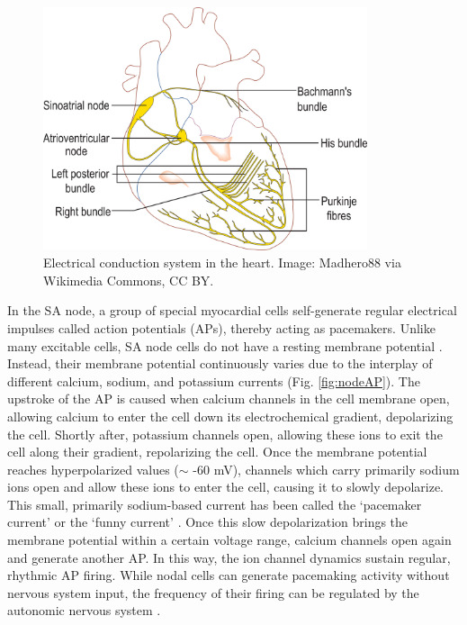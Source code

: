 \documentclass[12pt]{article}
\begin{document}
\begin{figure}[h!]
\centering
\includegraphics[width=0.85\textwidth]{figures/conduction.png}
\caption{Electrical conduction system in the heart. Image: Madhero88 via Wikimedia Commons, CC BY.}
\label{fig:conduction}
\end{figure}

In the SA node, a group of special myocardial cells self-generate regular electrical impulses called action potentials (APs), thereby acting as pacemakers. Unlike many excitable cells, SA node cells do not have a resting membrane potential \cite{openStaxElectrical,mohrman2006cardiovascular}. Instead, their membrane potential continuously varies due to the interplay of different calcium, sodium, and potassium currents  (Fig. \ref{fig:nodeAP}). The upstroke of the AP is caused when calcium channels in the cell membrane open, allowing calcium to enter the cell down its electrochemical gradient, depolarizing the cell. Shortly after, potassium channels open, allowing these ions to exit the cell along their gradient, repolarizing the cell. Once the membrane potential reaches hyperpolarized values ($\sim$ -60 mV), channels which carry primarily sodium ions open and allow these ions to enter the cell, causing it to slowly depolarize. This small, primarily sodium-based current has been called the `pacemaker current' or the `funny current' \cite{difrancesco2012funny}. Once this slow depolarization brings the membrane potential within a certain voltage range, calcium channels open again and generate another AP. In this way, the ion channel dynamics sustain regular, rhythmic AP firing. While nodal cells can generate pacemaking activity without nervous system input, the frequency of their firing can be regulated by the autonomic nervous system \cite{openStaxElectrical,mohrman2006cardiovascular}.
\end{document}
